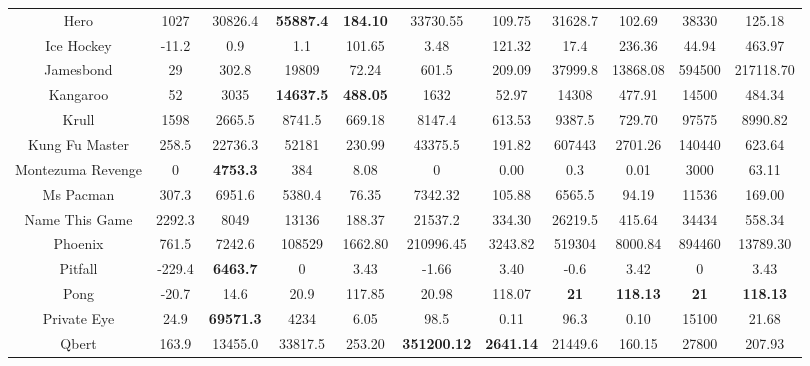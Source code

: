 \documentclass[nohyperref]{article}
\newcommand{\best}[1]{\textbf{#1}}
\theoremstyle{plain}
\begin{document}
\begin{table}[!hb]
\begin{center}
\begin{tabular}{ |c| c| c| c c| c c| c c| c c| }
 Hero   & 1027 & 30826.4            & \textbf{55887.4} & \textbf{184.10}   & 33730.55  & 109.75  & 31628.7 & 102.69 &38330             &125.18              \\
 Ice Hockey & -11.2 & 0.9           & 1.1    & 101.65   & 3.48      & 121.32   & 17.4    & 236.36                   &44.94      &463.97   \\
 Jamesbond  & 29    & 302.8         & 19809 & 72.24   & 601.5     & 209.09   & 37999.8 & 13868.08                   &594500     &217118.70   \\
 Kangaroo   & 52    & 3035          & \textbf{14637.5} & \textbf{488.05} & 1632    & 52.97    & 14308   & 477.91    &14500             &484.34              \\
 Krull     & 1598   & 2665.5        & 8741.5  & 669.18 & 8147.4  & 613.53   & 9387.5  &  729.70                     &97575      &8990.82       \\
 Kung Fu Master & 258.5 & 22736.3   & 52181 & 230.99 & 43375.5 & 191.82 & 607443 & 2701.26        &140440            &623.64                   \\
 Montezuma Revenge&0&\textbf{4753.3}& 384   & 8.08   & 0       & 0.00   & 0.3    & 0.01                             &3000              &63.11           \\
 Ms Pacman  & 307.3 & 6951.6        & 5380.4  & 76.35   & 7342.32 & 105.88 & 6565.5   & 94.19                       &11536      &169.00       \\
 Name This Game & 2292.3 & 8049     & 13136 & 188.37   & 21537.2 & 334.30 & 26219.5 & 415.64                        &34434      &558.34        \\
 Phoenix & 761.5 & 7242.6  & 108529 & 1662.80   & 210996.45  & 3243.82 & 519304 & 8000.84                           &894460     &13789.30    \\
 Pitfall & -229.4 & \textbf{6463.7} & 0      & 3.43      & -1.66      & 3.40    & -0.6   & 3.42                     &0                 &3.43            \\
 Pong    & -20.7  & 14.6   & 20.9   & 117.85    & 20.98      & 118.07  & \textbf{21}     &  \textbf{118.13}         &\best{21   }      &\best{118.13}     \\
 Private Eye & 24.9&\textbf{69571.3}& 4234 & 6.05     & 98.5       & 0.11    & 96.3   & 0.10                        &15100             &21.68                 \\
 Qbert  & 163.9 & 13455.0 & 33817.5 & 253.20   & \textbf{351200.12}  & \textbf{2641.14} & 21449.6 & 160.15          &27800             &207.93         \\

\end{tabular}
\end{center}
\end{table}
\end{document}

